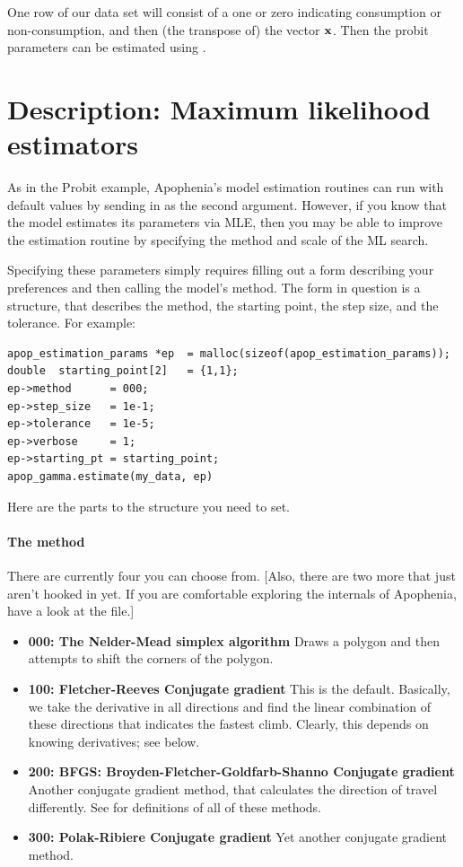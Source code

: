 One row of our data set will consist of a one or zero indicating
consumption or non-consumption, and then (the transpose of) the vector
${\bf x}$. Then the probit parameters can be estimated using
.

\section{Description: Maximum likelihood estimators} 
As in the Probit example, Apophenia's model estimation routines can run
with default values by sending in  as the second
argument. However, if you know that the model estimates its parameters
via MLE, then you may be able to improve the estimation routine by
specifying the method and scale of the ML search.

Specifying these parameters simply requires 
filling out a form describing your preferences and then calling the model's  method.
The form in question is a  structure, that
describes the method, the starting point, the step size, and the
tolerance.
For example:
\begin{lstlisting}
apop_estimation_params *ep  = malloc(sizeof(apop_estimation_params));
double  starting_point[2]   = {1,1};
ep->method      = 000;
ep->step_size   = 1e-1;
ep->tolerance   = 1e-5;
ep->verbose     = 1;
ep->starting_pt = starting_point;
apop_gamma.estimate(my_data, ep)
\end{lstlisting}

Here are the parts to the  
structure you need to set. 

\paragraph{The method} There are currently four you can choose from.
[Also, there are two more that  just aren't hooked in yet. If you are
comfortable exploring the internals of Apophenia, have a look at the
 file.]


\begin{itemize}
\item {\bf 000: The Nelder-Mead simplex algorithm} Draws a polygon and then attempts to shift the corners of the polygon.
\item {\bf 100: Fletcher-Reeves Conjugate gradient} This is the
default. Basically, we take the derivative in all directions and find
the linear combination of these directions that indicates the fastest
climb. Clearly, this depends on knowing derivatives; see below.
\item {\bf 200: BFGS: Broyden-Fletcher-Goldfarb-Shanno Conjugate gradient}  Another conjugate gradient method, that calculates the direction of travel differently. See \cite{avriel:nonlinear} for definitions of all of these methods.
\item {\bf 300: Polak-Ribiere Conjugate gradient} Yet another conjugate gradient method.
\end{itemize}

